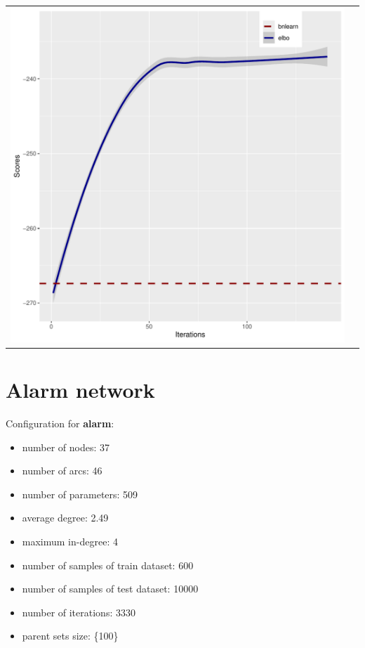 \documentclass[]{scrartcl}
\begin{document}
\begin{tabular}{cc}
\includegraphics[scale = 0.4]{./figs/asia/mapEvolution-5-142.pdf}  & \\
\end{tabular}

\clearpage

\section{Alarm network}

Configuration for \textbf{alarm}:

\begin{itemize}
\item number of nodes: 37
\item number of arcs: 46
\item number of parameters: 509
\item average degree: 2.49
\item maximum in-degree: 4
\item number of samples of train dataset: 600
\item number of samples of test dataset: 10000
\item number of iterations: 3330
\item parent sets size: \{100\}
\end{itemize}
\end{document}
